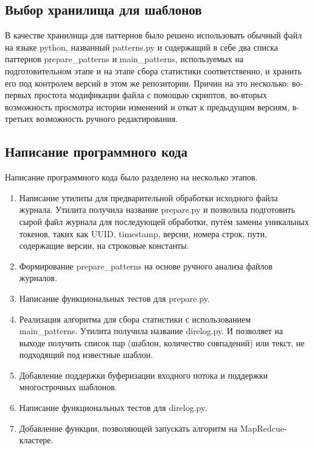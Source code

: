 \subsection{Выбор хранилища для шаблонов}
В качестве хранилища для паттернов было решено использовать обычный файл на
языке python, названный patterns.py и содержащий в себе два списка паттернов
prepare\_patterns и main\_patterns, используемых на подготовительном этапе
и на этапе сбора статистики соответственно,
и хранить его под контролем версий в этом же репозитории. Причин
на это несколько: во-первых простота модификации файла с помощью скриптов,
во-вторых возможность просмотра истории изменений и откат к предыдущим версиям,
в-третьих возможность ручного редактирования.

\subsection{Написание программного кода}

Написание программного кода было разделено на несколько этапов.
\begin{enumerate}
\item Написание утилиты для предварительной обработки исходного файла журнала.
  Утилита получила название prepare.py и позволила подготовить сырой файл
  журнала для последующей обработки, путём замены уникальных токенов, таких
  как UUID, timestamp, версии, номера строк, пути, содержащие версии, на
  строковые константы.
\item Формирование prepare\_patterns на основе ручного анализа
  файлов журналов.
\item Написание функциональных тестов для prepare.py.
\item Реализация алгоритма для сбора статистики с использованием
  main\_patterns. Утилита получила название direlog.py. И позволяет на
  выходе получить список пар (шаблон, количество совпадений) или текст,
  не подходящий под известные шаблон.
\item Добавление поддержки буферизации входного потока и поддержки
  многострочных шаблонов.
\item Написание функциональных тестов для direlog.py.
\item Добавление функции, позволяющей запускать алгоритм на MapRedcue-кластере.
\end{enumerate}

